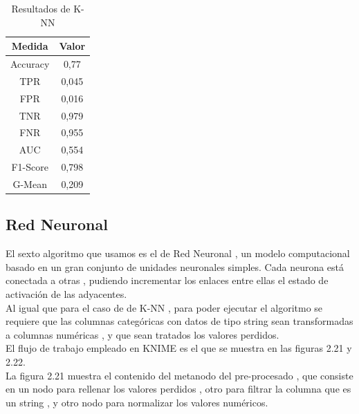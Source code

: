	\begin{table}[htbp]
		\begin{center}
			\begin{tabular}{|c|c|}
				\hline
				Medida & Valor \\
				\hline \hline
				Accuracy & 0,77 \\
				\hline
				TPR &  0,045 \\
				\hline
				FPR &  0,016 \\
				\hline
				TNR &  0,979 \\
				\hline
				FNR &  0,955 \\
				\hline
				AUC &  0,554 \\
				\hline
				F1-Score & 0,798 \\
				\hline	
				G-Mean & 0,209 \\
				\hline
			\end{tabular}
			\caption{Resultados de K-NN}
			\label{tabla:sencilla}
		\end{center}
	\end{table}


	\subsection{Red Neuronal}

	El sexto algoritmo que usamos es el de Red Neuronal \cite{Wikipedia6} , un modelo computacional basado en un gran conjunto de unidades 
	neuronales simples. Cada neurona está conectada a otras , pudiendo incrementar los enlaces entre ellas el estado de activación de las adyacentes. \\
	
	Al igual que para el caso de de K-NN , para poder ejecutar el algoritmo se requiere que las columnas categóricas con datos de tipo string sean transformadas a columnas numéricas , y que 
	sean tratados los valores perdidos.  \\

	El flujo de trabajo empleado en KNIME es el que se muestra en las figuras 2.21 y 2.22. \\
	
	La figura 2.21 muestra el contenido del metanodo del pre-procesado , que consiste en un nodo para rellenar los valores perdidos , otro para filtrar la columna que es un string , y otro 
	nodo para normalizar los valores numéricos. 


